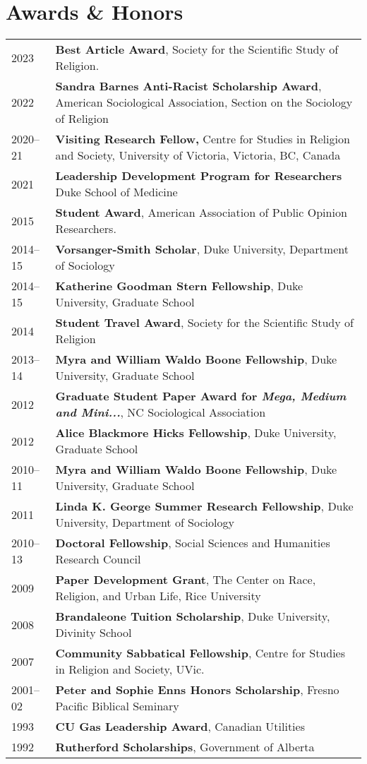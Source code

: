 \section*{Awards \& Honors}

\begin{longtable}{p{} p{}}
2023 & \textbf{Best Article Award}, Society for the Scientific Study of Religion.\\
2022  & \textbf{Sandra Barnes Anti-Racist Scholarship Award}, American Sociological Association, Section on the Sociology of Religion\\
2020--21 & \textbf{Visiting Research Fellow,} Centre for Studies in Religion and Society, University of Victoria, Victoria, BC, Canada \\
2021 & \textbf{Leadership Development Program for Researchers} Duke School of Medicine\\
2015 & \textbf{Student Award}, American Association of Public Opinion Researchers.\\
2014--15 & \textbf{Vorsanger-Smith Scholar}, Duke University, Department of Sociology\\
2014--15 & \textbf{Katherine Goodman Stern Fellowship}, Duke University, Graduate School\\
2014 & \textbf{Student Travel Award}, Society for the Scientific Study of Religion\\
2013--14 & \textbf{Myra and William Waldo Boone Fellowship}, Duke University, Graduate School\\
2012 & \textbf{Graduate Student Paper Award for \emph{Mega, Medium and Mini...}}, NC Sociological Association\\
2012 & \textbf{Alice Blackmore Hicks Fellowship}, Duke University, Graduate School\\
2010--11 & \textbf{Myra and William Waldo Boone Fellowship}, Duke University, Graduate School\\
2011 & \textbf{Linda K. George Summer Research Fellowship}, Duke University, Department of Sociology\\
2010--13 & \textbf{Doctoral Fellowship}, Social Sciences and Humanities Research Council\\
2009 & \textbf{Paper Development Grant}, The Center on Race, Religion, and Urban Life, Rice University\\
2008 & \textbf{Brandaleone Tuition Scholarship}, Duke University, Divinity School\\
2007 & \textbf{Community Sabbatical Fellowship}, Centre for Studies in Religion and Society, UVic.\\
2001--02 & \textbf{Peter and Sophie Enns Honors Scholarship}, Fresno Pacific Biblical Seminary\\
1993 & \textbf{CU Gas Leadership Award}, Canadian Utilities\\
1992 & \textbf{Rutherford Scholarships}, Government of Alberta\\
\end{longtable}
